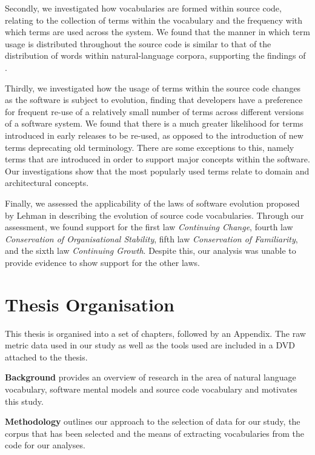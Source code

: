 Secondly, we investigated how vocabularies are formed within source code, relating to the collection of terms within the vocabulary and the frequency with which terms are used across the system. We found that the manner in which term usage is distributed throughout the source code is similar to that of the distribution of words within natural-language corpora, supporting the findings of \cite{Pierret09a}.

Thirdly, we investigated how the usage of terms within the source code changes as the software is subject to evolution, finding that developers have a preference for frequent re-use of a relatively small number of terms across different versions of a software system. We found that there is a much greater likelihood for terms introduced in early releases to be re-used, as opposed to the introduction of new terms deprecating old terminology. There are some exceptions to this, namely terms that are introduced in order to support major concepts within the software. Our investigations show that the most popularly used terms relate to domain and architectural concepts.

Finally, we assessed the applicability of the laws of software evolution proposed by Lehman \cite{Lehman80a,Lehman97a} in describing the evolution of source code vocabularies. Through our assessment, we found support for the first law \emph{Continuing Change}, fourth law \emph{Conservation of Organisational Stability}, fifth law \emph{Conservation of Familiarity}, and the sixth law \emph{Continuing Growth}. Despite this, our analysis was unable to provide evidence to show support for the other laws.


\section{Thesis Organisation} %
\label{sec:thesis_organisation}

This thesis is organised into a set of chapters, followed by an Appendix. The raw metric data used in our study as well as the tools used are included in a DVD attached to the thesis.

\textbf{Background} provides an overview of research in the area of natural language vocabulary, software mental models and source code vocabulary and motivates this study.

\textbf{Methodology} outlines our approach to the selection of data for our study, the corpus that has been selected and the means of extracting vocabularies from the code for our analyses.

